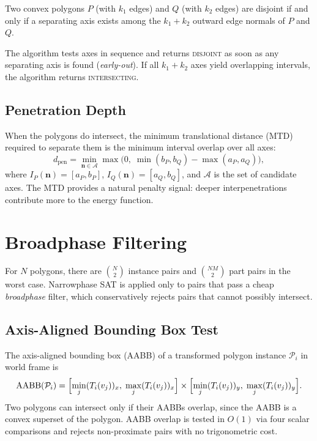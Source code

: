 \begin{corollary}
Two convex polygons $P$ (with $k_1$ edges) and $Q$ (with $k_2$ edges)
are disjoint if and only if a separating axis exists among the $k_1 + k_2$
outward edge normals of $P$ and $Q$.
\end{corollary}

The algorithm tests axes in sequence and returns \textsc{disjoint} as
soon as any separating axis is found (\emph{early-out}).
If all $k_1 + k_2$ axes yield overlapping intervals, the algorithm
returns \textsc{intersecting}.

\subsection{Penetration Depth}

When the polygons do intersect, the minimum translational distance (MTD)
required to separate them is the minimum interval overlap over all axes:
\[
  d_{\mathrm{pen}} = \min_{\mathbf{n} \in \mathcal{A}}
  \max\!\bigl(0,\;
    \min(b_{P}, b_{Q}) - \max(a_{P}, a_{Q})
  \bigr),
\]
where $I_P(\mathbf{n}) = [a_P, b_P]$, $I_Q(\mathbf{n}) = [a_Q, b_Q]$,
and $\mathcal{A}$ is the set of candidate axes.
The MTD provides a natural penalty signal: deeper interpenetrations
contribute more to the energy function.

\section{Broadphase Filtering}
\label{sec:broadphase}

For $N$ polygons, there are $\binom{N}{2}$ instance pairs and
$\binom{NM}{2}$ part pairs in the worst case.
Narrowphase SAT is applied only to pairs that pass a cheap
\emph{broadphase} filter, which conservatively rejects pairs
that cannot possibly intersect.

\subsection{Axis-Aligned Bounding Box Test}

The axis-aligned bounding box (AABB) of a transformed polygon instance
$\mathcal{P}_i$ in world frame is
\[
  \mathrm{AABB}(\mathcal{P}_i)
  = \Bigl[\min_j (T_i(v_j))_x,\; \max_j (T_i(v_j))_x\Bigr]
  \times
  \Bigl[\min_j (T_i(v_j))_y,\; \max_j (T_i(v_j))_y\Bigr].
\]
Two polygons can intersect only if their AABBs overlap, since the AABB
is a convex superset of the polygon. AABB overlap is tested in $O(1)$
via four scalar comparisons and rejects non-proximate pairs with no
trigonometric cost.

